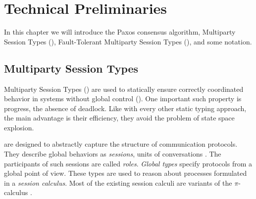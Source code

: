 \chapter{Technical Preliminaries}
In this chapter we will introduce the Paxos consensus algorithm, Multiparty Session Types (\MPST), Fault-Tolerant Multiparty Session Types (\FTMPST), and some notation.




\section{Multiparty Session Types}
Multiparty Session Types (\MPST) are used to statically ensure correctly coordinated behavior in systems without global control (\cite{hondaYoshidaCarbone16,CoppoEtal15}).
One important such property is progress, \ie the absence of deadlock. Like with every other static typing approach, the main advantage is their efficiency, \ie they avoid the problem of state space explosion.

\MPST are designed to abstractly capture the structure of communication protocols.
They describe global behaviors as \emph{sessions}, \ie units of
conversations \cite{hondaYoshidaCarbone16,BettiniEtal08,BocciEtal10}. The participants of such sessions are called \emph{roles}.
\emph{Global types} specify protocols from a global point of view.
These types are used to reason about processes formulated
in a \emph{session calculus}. Most of the existing session calculi are
variants of the $ \pi $-calculus \cite{MilnerParrowWalker92}.




